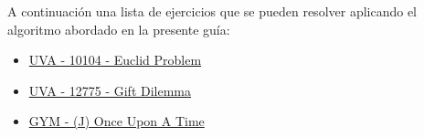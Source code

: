 A continuación una lista de ejercicios que se pueden resolver aplicando el algoritmo abordado en la presente guía:
\begin{itemize}
	\item \href{https://uva.onlinejudge.org/index.php?option=com_onlinejudge&Itemid=8&page=show_problem&problem=1045}{UVA - 10104 - Euclid Problem}
	\item \href{https://uva.onlinejudge.org/index.php?option=com_onlinejudge&Itemid=8&page=show_problem&problem=4628}{UVA - 12775 - Gift Dilemma}
	\item \href{http://codeforces.com/gym/100963}{GYM - (J) Once Upon A Time}
\end{itemize}